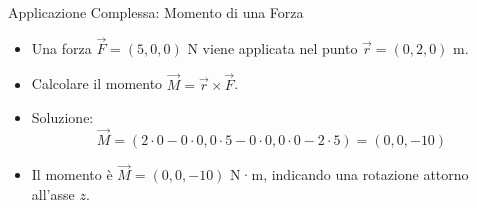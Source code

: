 \documentclass{beamer}
\begin{document}
\begin{frame}{Applicazione Complessa: Momento di una Forza}
    \begin{itemize}
        \item Una forza \( \vec{F} = (5, 0, 0) \) N viene applicata nel punto \( \vec{r} = (0, 2, 0) \) m.
        \item Calcolare il momento \( \vec{M} = \vec{r} \times \vec{F} \).
        \item Soluzione:
        \[
        \vec{M} = (2 \cdot 0 - 0 \cdot 0, 0 \cdot 5 - 0 \cdot 0, 0 \cdot 0 - 2 \cdot 5) = (0, 0, -10)
        \]
        \item Il momento è \( \vec{M} = (0, 0, -10) \) N·m, indicando una rotazione attorno all'asse \( z \).
    \end{itemize}
\end{frame}
\end{document}
